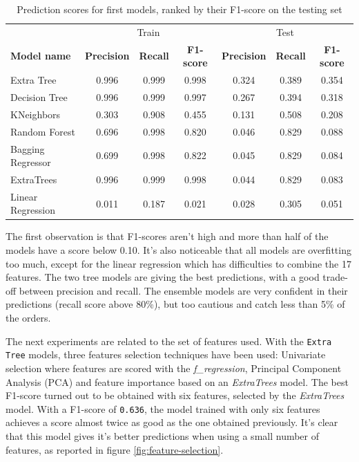 \begin{table}[htb]
    \begin{tabular}{l|ccc|ccc}
                          & \multicolumn{3}{c|}{Train}                         & \multicolumn{3}{c}{Test}      \\
        \textbf{Model name}        & \textbf{Precision} & \textbf{Recall} & \textbf{F1-score} & \textbf{Precision} & \textbf{Recall} & \textbf{F1-score} \\ \hline
        Extra Tree        & 0.996     & 0.999  & 0.998                         & 0.324     & 0.389  & 0.354    \\
        Decision Tree     & 0.996     & 0.999  & 0.997                         & 0.267     & 0.394  & 0.318   \\
        KNeighbors        & 0.303     & 0.908  & 0.455                         & 0.131     & 0.508  & 0.208    \\
        Random Forest     & 0.696     & 0.998  & 0.820                         & 0.046     & 0.829  & 0.088    \\
        Bagging Regressor & 0.699     & 0.998  & 0.822                         & 0.045     & 0.829  & 0.084    \\
        ExtraTrees        & 0.996     & 0.999  & 0.998                         & 0.044     & 0.829  & 0.083    \\
        Linear Regression & 0.011     & 0.187  & 0.021                         & 0.028     & 0.305  & 0.051    
    \end{tabular}
    \caption[Prediction scores for first models]{Prediction scores for first models, ranked by their F1-score on the testing set}
    \label{tab:scores-simple-models}
\end{table}

The first observation is that F1-scores aren't high and more than half of the models have a score below 0.10. It's also noticeable that all models are overfitting too much, except for the linear regression which has difficulties to combine the 17 features. The two tree models are giving the best predictions, with a good trade-off between precision and recall. The ensemble models are very confident in their predictions (recall score above 80\%), but too cautious and catch less than 5\% of the orders.

The next experiments are related to the set of features used. With the \texttt{Extra Tree} models, three features selection techniques have been used: Univariate selection where features are scored with the \textit{f\_regression}, Principal Component Analysis (PCA) and feature importance based on an \textit{ExtraTrees} model. The best F1-score turned out to be obtained with six features, selected by the \textit{ExtraTrees} model. With a F1-score of \texttt{0.636}, the model trained with only six features achieves a score almost twice as good as the one obtained previously. It's clear that this model gives it's better predictions when using a small number of features, as reported in figure \ref{fig:feature-selection}.

